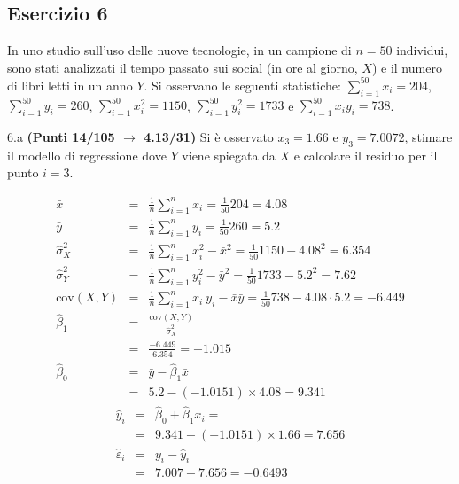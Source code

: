 \documentclass[
  11pt,
]{book}
\theoremstyle{mytheoremstyle}
\theoremstyle{mydefstyle}
\newenvironment{sol}
  {
  \begin{tcolorbox}[enhanced,breakable,arc=0.1mm,boxrule=1pt,colback=white,colframe=iblue,
  title=\bf \fontfamily{lmss}\selectfont \hspace{.5 cm} Soluzione,drop fuzzy shadow]

}{
\end{tcolorbox}
  }
\begin{document}
\subsection{Esercizio 6}\label{esercizio-6-32}

In uno studio sull'uso delle nuove tecnologie, in un campione di \(n=50\) individui, sono stati analizzati il tempo passato sui social (in ore al giorno, \(X\)) e il numero di libri letti in un anno \(Y\).
Si osservano le seguenti statistiche:
\(\sum_{i=1}^{50}x_i=204\), \(\sum_{i=1}^{50}y_i=260\),
\(\sum_{i=1}^{50}x_i^2=1150\), \(\sum_{i=1}^{50}y_i^2=1733\) e \(\sum_{i=1}^{50}x_iy_i=738\).

6.a \textbf{(Punti 14/105 \(\rightarrow\) 4.13/31)} Si è osservato \(x_3=1.66\) e \(y_3=7.0072\), stimare il modello di regressione dove \(Y\) viene spiegata da \(X\) e calcolare il residuo per il punto \(i=3\).

\begin{sol}
\begin{eqnarray*}
           \bar x &=&\frac 1 n\sum_{i=1}^n x_i = \frac {1}{ 50 }  204 =  4.08 \\
           \bar y &=&\frac 1 n\sum_{i=1}^n y_i = \frac {1}{ 50 }  260 =  5.2 \\
           \hat\sigma_X^2&=&\frac 1 n\sum_{i=1}^n x_i^2-\bar x^2=\frac {1}{ 50 }  1150  - 4.08 ^2= 6.354 \\
           \hat\sigma_Y^2&=&\frac 1 n\sum_{i=1}^n y_i^2-\bar y^2=\frac {1}{ 50 }  1733  - 5.2 ^2= 7.62 \\
           \text{cov}(X,Y)&=&\frac 1 n\sum_{i=1}^n x_i~y_i-\bar x\bar y=\frac {1}{ 50 }  738 - 4.08 \cdot 5.2 = -6.449 \\
           \hat\beta_1 &=& \frac{\text{cov}(X,Y)}{\hat\sigma_X^2} \\
                    &=& \frac{ -6.449 }{ 6.354 }  =  -1.015 \\
           \hat\beta_0 &=& \bar y - \hat\beta_1 \bar x\\
                    &=&  5.2 - (-1.0151) \times  4.08 = 9.341 
         \end{eqnarray*}\begin{eqnarray*}
\hat y_i &=&\hat\beta_0+\hat\beta_1 x_i=\\ 
&=& 9.341 + (-1.0151) \times 1.66 = 7.656 \\ 
\hat \varepsilon_i &=& y_i-\hat y_i\\ 
&=& 7.007 - 7.656 = -0.6493  
\end{eqnarray*}

\end{sol}
\end{document}
